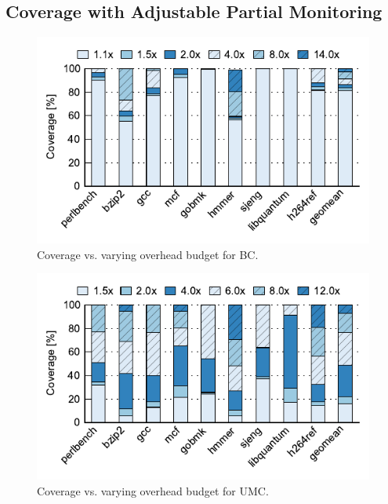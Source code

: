 \subsection{Coverage with Adjustable Partial Monitoring}

\begin{figure}
  \begin{center}
    \includegraphics[width=\linewidth]{figs/data_hb_sweep.pdf}
    \vspace{-0.2in}
    \caption{Coverage vs. varying overhead budget for BC.}
    \label{fig:evaluation.bc_sweep}
    \vspace{-0.2in}
  \end{center}
\end{figure}

\begin{figure}
  \begin{center}
    \includegraphics[width=\linewidth]{figs/data_umc_sweep.pdf}
    \vspace{-0.2in}
    \caption{Coverage vs. varying overhead budget for UMC.}
    \label{fig:evaluation.umc_sweep}
    \vspace{-0.1in}
  \end{center}
\end{figure}


